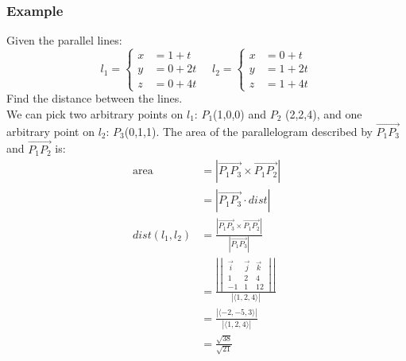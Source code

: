 \documentclass[letterpaper, 12pt]{math}
\begin{document}
\subsubsection*{Example}
Given the parallel lines:
\[ l_1 = \begin{cases}
  x &= 1+t \\
  y &= 0+2t \\
  z &= 0+4t
\end{cases} \quad l_2 = \begin{cases}
  x &= 0+t \\
  y &= 1+2t \\
  z &= 1+4t
\end{cases} \]
Find the distance between the lines. \\
We can pick two arbitrary points on \( l_1 \): \( P_1 \)(1,0,0) and \( P_2 \)
(2,2,4), and one arbitrary point on \( l_2 \): \( P_3 \)(0,1,1). The area
of the parallelogram described by \( \overrightarrow{P_1P_3} \) and
\( \overrightarrow{P_1P_2} \) is:
\begin{align*}
  \text{area} &= |\overrightarrow{P_1P_3}\times\overrightarrow{P_1P_2}| \\
  &= |\overrightarrow{P_1P_3}\cdot dist| \\
  dist(l_1,l_2) &= \frac{|\overrightarrow{P_1P_3}\times\overrightarrow{P_1P_2}|}
    {|\overrightarrow{P_1P_3}|} \\
  &= \frac{\left|\begin{vmatrix}
    \vec{i} & \vec{j} & \vec{k} \\
    1 & 2 & 4 \\
    -1 & 1 & 12
  \end{vmatrix}\right|}{|\langle1,2,4\rangle|} \\
  &= \frac{|\langle-2,-5,3\rangle|}{|\langle1,2,4\rangle|} \\
  &= \frac{\sqrt{38}}{\sqrt{21}}
\end{align*}
\end{document}

